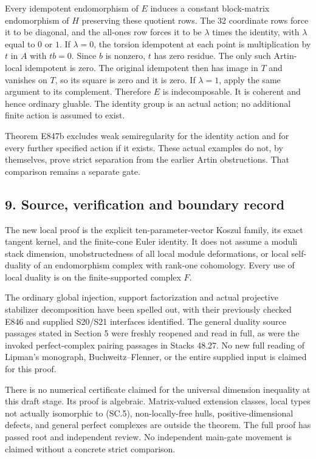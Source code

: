 Every idempotent endomorphism of \(E\) induces a constant block-matrix
endomorphism of \(H\) preserving these quotient rows. The 32 coordinate
rows force it to be diagonal, and the all-ones row forces it to be
\(\lambda\) times the identity, with \(\lambda\) equal to \(0\) or \(1\). If \(\lambda=0\),
the torsion idempotent at each point is multiplication by \(t\) in \(A\) with
\(tb=0\). Since \(b\) is nonzero, \(t\) has zero residue. The only such Artin-local
idempotent is zero. The original idempotent then has image in \(T\) and
vanishes on \(T\), so its square is zero and it is zero. If \(\lambda=1\),
apply the same argument to its complement. Therefore \(E\) is indecomposable.
It is coherent and hence ordinary gluable. The identity group is an
actual action; no additional finite action is assumed to exist.

Theorem E847b excludes weak semiregularity for the identity action and
for every further specified action if it exists. These actual examples
do not, by themselves, prove strict separation from the earlier Artin
obstructions. That comparison remains a separate gate.

\subsection{9. Source, verification and boundary record}\label{SF-E847:s9}

The new local proof is the explicit ten-parameter-vector Koszul family,
its exact tangent kernel, and the finite-cone Euler identity. It does not
assume a moduli stack dimension, unobstructedness of all local module
deformations, or local self-duality of an endomorphism complex with
rank-one cohomology. Every use of local duality is on the finite-supported
complex \(F\).

The ordinary global injection, support factorization and actual projective
stabilizer decomposition have been spelled out, with their previously
checked E846 and supplied S20/S21 interfaces identified. The general
duality source passages stated in Section 5 were freshly reopened and
read in full, as were the invoked perfect-complex pairing passages in
Stacks 48.27. No new full reading of Lipman's monograph, Buchweitz--Flenner,
or the entire supplied input is claimed for this proof.

There is no numerical certificate claimed for the universal dimension
inequality at this draft stage. Its proof is algebraic. Matrix-valued
extension classes, local types not actually isomorphic to (SC.5),
non-locally-free hulls, positive-dimensional defects, and general perfect
complexes are outside the theorem. The full proof has passed root and independent review. No independent
main-gate movement is claimed without a concrete strict comparison.
